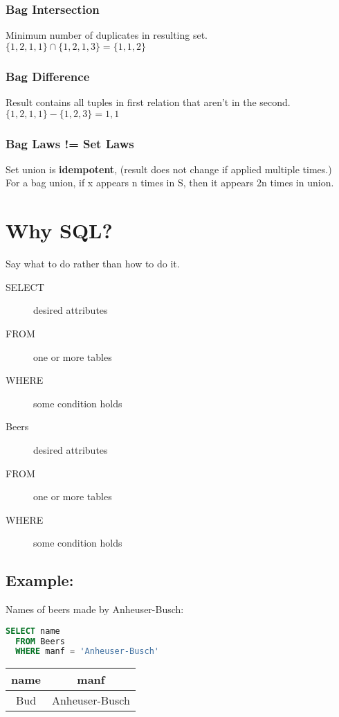 \documentclass[12pt]{article}
\begin{document}
\subsubsection{Bag Intersection}
Minimum number of duplicates in resulting set.\\
$\{1,2,1,1\} \cap \{1,2,1,3\} = \{1,1,2\}$
\subsubsection{Bag Difference}
Result contains all tuples in first relation that aren't in the second.\\
$\{1,2,1,1\} - \{1,2,3\} = {1,1}$
\subsubsection{Bag Laws != Set Laws}
Set union is \textbf{idempotent}, (result does not change if applied multiple
times.)\\
For a bag union, if x appears n times in S, then it appears 2n times in union.

\section{Why SQL?}
Say what to do rather than how to do it.
\begin{description}
    \item[SELECT]{desired attributes}
    \item[FROM]{one or more tables}
    \item[WHERE]{some condition holds}
\end{description}

\begin{description}
    \item[Beers]{desired attributes}
    \item[FROM]{one or more tables}
    \item[WHERE]{some condition holds}
\end{description}

\subsection{Example:}
Names of beers made by Anheuser-Busch:
\begin{lstlisting}[language=SQL]
  SELECT name
  FROM Beers
  WHERE manf = 'Anheuser-Busch'
\end{lstlisting}

\begin{table}[H]
  \begin{tabular}{|c|c|}
    \hline
    name & manf\\
    \hline
    Bud & Anheuser-Busch\\
    \hline
\end{tabular}
\end{table}
\end{document}
